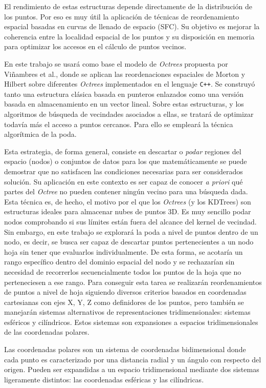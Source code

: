 El rendimiento de estas estructuras depende directamente de la distribución de los puntos. Por eso es muy útil la aplicación de técnicas de reordenamiento espacial basadas en curvas de llenado de espacio (SFC). Su objetivo es mejorar la coherencia entre la localidad espacial de los puntos y su disposición en memoria para optimizar los accesos en el cálculo de puntos vecinos.

En este trabajo se usará como base el modelo de \textit{Octrees} propuesta por Viñambres et al.\cite{Vinambres},  donde se aplican las reordenaciones espaciales de Morton y Hilbert sobre diferentes \textit{Octrees} implementados en el lenguaje \texttt{C++}. Se construyó tanto una estructura clásica basada en punteros enlazados como una versión basada en almacenamiento en un vector lineal. Sobre estas estructuras, y los algoritmos de búsqueda de vecindades asociados a ellas, se tratará de optimizar todavía más el acceso a puntos cercanos. Para ello se empleará la técnica algorítmica de la poda. 

Esta estrategia, de forma general, consiste en descartar o \textit{podar} regiones del espacio (nodos) o conjuntos de datos para los que matemáticamente se puede demostrar que no satisfacen las condiciones necesarias para ser considerados solución. Su aplicación en este contexto es ser capaz de conocer \textit{a priori} qué partes del \textit{Octree} no pueden contener ningún vecino para una búsqueda dada. Esta técnica es, de hecho, el motivo por el que los \textit{Octrees} (y los KDTrees) son estructuras ideales para almacenar nubes de puntos 3D. Es muy sencillo podar nodos comprobando si sus límites están fuera del alcance del kernel de vecindad. Sin embargo, en este trabajo se explorará la poda a nivel de puntos dentro de un nodo, es decir, se busca ser capaz de descartar puntos pertenecientes a un nodo hoja sin tener que evaluarlos individualmente. De esta forma, se acotaría un rango específico dentro del dominio espacial del nodo y se rechazarían sin necesidad de recorrerlos secuencialmente todos los puntos de la hoja que no perteneciesen a ese rango. Para conseguir esta tarea se realizarán reordenamientos de puntos a nivel de hoja siguiendo diversos criterios basados en coordenadas cartesianas con ejes X, Y, Z como definidores de los puntos, pero también se manejarán sistemas alternativos de representaciones tridimensionales: sistemas esféricos y cilíndricos. Estos sistemas son expansiones a espacios tridimensionales de las coordenadas polares.

Las coordenadas polares son un sistema de coordenadas bidimensional donde cada punto es caracterizado por una distancia radial y un ángulo con respecto del origen. Pueden ser expandidas a un espacio tridimensional mediante dos sistemas ligeramente distintos: las coordenadas esféricas y las cilíndricas.


